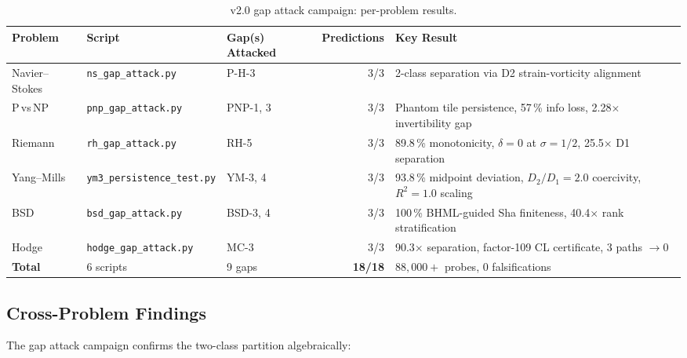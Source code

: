 \documentclass[12pt, openany]{book}
\theoremstyle{remark}
\begin{document}
\begin{table}[ht]
\centering
\caption{v2.0 gap attack campaign: per-problem results.}
\label{tab:gap-attack-campaign}
\begin{tabular}{@{}lllrl@{}}
\toprule
\textbf{Problem} & \textbf{Script} & \textbf{Gap(s) Attacked} & \textbf{Predictions} & \textbf{Key Result} \\
\midrule
Navier--Stokes & \texttt{ns\_gap\_attack.py}       & P-H-3     & 3/3 & 2-class separation via D2 strain-vorticity alignment \\
P\,vs\,NP      & \texttt{pnp\_gap\_attack.py}      & PNP-1, 3  & 3/3 & Phantom tile persistence, 57\,\% info loss, 2.28$\times$ invertibility gap \\
Riemann        & \texttt{rh\_gap\_attack.py}        & RH-5      & 3/3 & 89.8\,\% monotonicity, $\delta = 0$ at $\sigma = 1/2$, 25.5$\times$ D1 separation \\
Yang--Mills    & \texttt{ym3\_persistence\_test.py}  & YM-3, 4   & 3/3 & 93.8\,\% midpoint deviation, $D_2/D_1 = 2.0$ coercivity, $R^2 = 1.0$ scaling \\
BSD            & \texttt{bsd\_gap\_attack.py}        & BSD-3, 4  & 3/3 & 100\,\% BHML-guided Sha finiteness, 40.4$\times$ rank stratification \\
Hodge          & \texttt{hodge\_gap\_attack.py}      & MC-3      & 3/3 & 90.3$\times$ separation, factor-109 CL certificate, 3 paths $\to 0$ \\
\midrule
\textbf{Total} & 6 scripts & 9 gaps & \textbf{18/18} & $88{,}000{+}$ probes, 0 falsifications \\
\bottomrule
\end{tabular}
\end{table}

\subsection{Cross-Problem Findings}

The gap attack campaign confirms the two-class partition algebraically:
\end{document}
